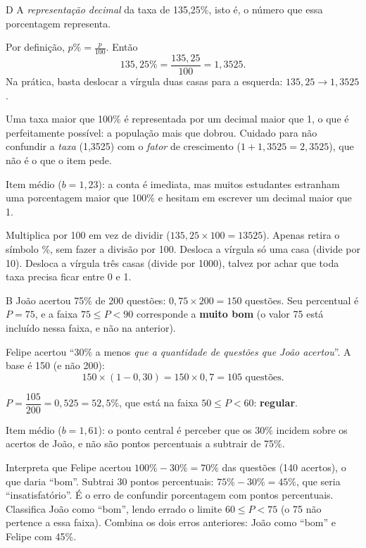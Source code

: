 \begin{resolucao}{D}
 A \emph{representação decimal} da taxa de 135,25\%,
isto é, o número que essa porcentagem representa.

 Por definição, $p\% = \frac{p}{100}$. Então
\[ 135{,}25\% = \frac{135{,}25}{100} = 1{,}3525. \]
Na prática, basta deslocar a vírgula duas casas para a esquerda:
$135{,}25 \to 1{,}3525$.

 Uma taxa maior que 100\% é representada por um
decimal maior que 1, o que é perfeitamente possível: a população mais que
dobrou. Cuidado para não confundir a \emph{taxa} (1,3525) com o \emph{fator} de
crescimento ($1 + 1{,}3525 = 2{,}3525$), que não é o que o item pede.


Item médio ($b = 1{,}23$): a conta é imediata, mas muitos estudantes estranham
uma porcentagem maior que 100\% e hesitam em escrever um decimal maior que 1.
\begin{distratores}
 Multiplica por 100 em vez de dividir ($135{,}25\times 100 = \num{13525}$).
 Apenas retira o símbolo \%, sem fazer a divisão por 100.
 Desloca a vírgula só uma casa (divide por 10).
 Desloca a vírgula três casas (divide por \num{1000}), talvez por achar
que toda taxa precisa ficar entre 0 e 1.
\end{distratores}
\end{resolucao}

\begin{resolucao}{B}
 João acertou 75\% de 200 questões: $0{,}75\times 200 = 150$
questões. Seu percentual é $P = 75$, e a faixa $75 \le P < 90$ corresponde a
\textbf{muito bom} (o valor 75 está incluído nessa faixa, e não na anterior).

 Felipe acertou ``30\% a menos \emph{que
a quantidade de questões que João acertou}''. A base é 150 (e não 200):
\[ 150\times(1-0{,}30) = 150\times 0{,}7 = 105 \text{ questões}. \]

 $P = \dfrac{105}{200} = 0{,}525 = 52{,}5\%$,
que está na faixa $50 \le P < 60$: \textbf{regular}.


Item médio ($b = 1{,}61$): o ponto central é perceber que os 30\% incidem sobre
os acertos de João, e não são pontos percentuais a subtrair de 75\%.
\begin{distratores}
 Interpreta que Felipe acertou $100\% - 30\% = 70\%$ das questões
(140 acertos), o que daria ``bom''.
 Subtrai 30 pontos percentuais: $75\% - 30\% = 45\%$, que seria
``insatisfatório''. É o erro de confundir porcentagem com pontos percentuais.
 Classifica João como ``bom'', lendo errado o limite $60 \le P < 75$ (o 75
não pertence a essa faixa).
 Combina os dois erros anteriores: João como ``bom'' e Felipe com 45\%.
\end{distratores}
\end{resolucao}

